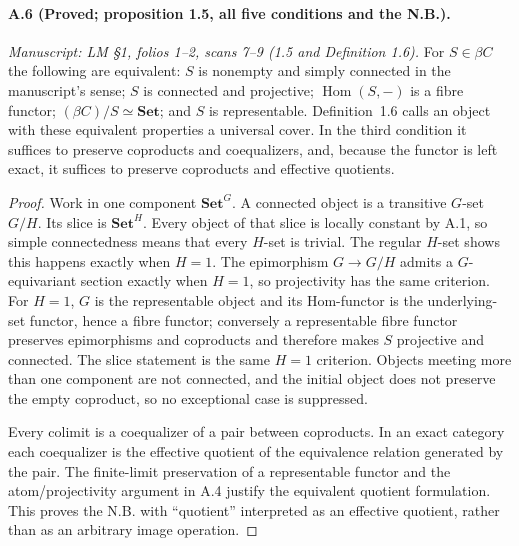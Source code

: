 \paragraph{A.6 (Proved; proposition 1.5, all five conditions and the N.B.).}
\textit{Manuscript: LM \S1, folios 1--2, scans 7--9 (1.5 and Definition 1.6).}
For $S\in\beta C$ the following are equivalent: $S$ is nonempty and simply connected in the manuscript's sense; $S$ is connected and projective; $\operatorname{Hom}(S,-)$ is a fibre functor; $(\beta C)/S\simeq\mathbf{Set}$; and $S$ is representable. Definition~1.6 calls an object with these equivalent properties a universal cover. In the third condition it suffices to preserve coproducts and coequalizers, and, because the functor is left exact, it suffices to preserve coproducts and effective quotients.
\begin{proof}
Work in one component $\mathbf{Set}^{G}$. A connected object is a transitive $G$-set $G/H$. Its slice is $\mathbf{Set}^{H}$. Every object of that slice is locally constant by A.1, so simple connectedness means that every $H$-set is trivial. The regular $H$-set shows this happens exactly when $H=1$. The epimorphism $G\to G/H$ admits a $G$-equivariant section exactly when $H=1$, so projectivity has the same criterion. For $H=1$, $G$ is the representable object and its Hom-functor is the underlying-set functor, hence a fibre functor; conversely a representable fibre functor preserves epimorphisms and coproducts and therefore makes $S$ projective and connected. The slice statement is the same $H=1$ criterion. Objects meeting more than one component are not connected, and the initial object does not preserve the empty coproduct, so no exceptional case is suppressed.

Every colimit is a coequalizer of a pair between coproducts. In an exact category each coequalizer is the effective quotient of the equivalence relation generated by the pair. The finite-limit preservation of a representable functor and the atom/projectivity argument in A.4 justify the equivalent quotient formulation. This proves the N.B. with ``quotient'' interpreted as an effective quotient, rather than as an arbitrary image operation. 
\end{proof}

